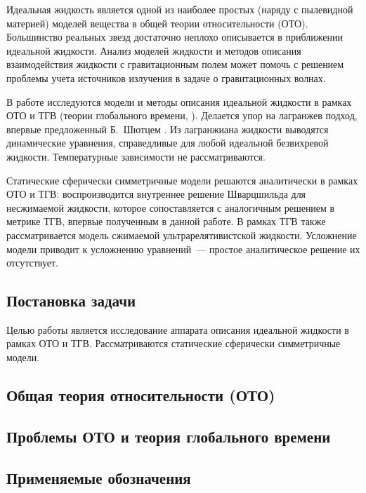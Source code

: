 \documentclass[\docroot/reports/draft/report.tex]{subfiles}
\begin{document}
\onlyinsubfile{\tableofcontents}

Идеальная жидкость является одной из наиболее простых (наряду с пылевидной материей) моделей вещества в общей теории относительности (ОТО). Большинство реальных звезд достаточно неплохо описывается в приближении идеальной жидкости. Анализ моделей жидкости и методов описания взаимодействия жидкости с гравитационным полем может помочь с решением проблемы учета источников излучения в задаче о гравитационных волнах.

В работе исследуются модели и методы описания идеальной жидкости в рамках ОТО и ТГВ (теории глобального времени, \cite{burlankov_space_dynamics,burlankov_grav_waves,burlankov_new_phys}). Делается упор на лагранжев подход, впервые предложенный Б.~Шютцем \cite{schutz_vel_pot}. Из лагранжиана жидкости выводятся динамические уравнения, справедливые для любой идеальной безвихревой жидкости. Температурные зависимости не рассматриваются.

Статические сферически симметричные модели решаются аналитически в рамках ОТО и ТГВ: воспроизводится внутреннее решение Шварцшильда для несжимаемой жидкости, которое сопоставляется с аналогичным решением в метрике ТГВ, впервые полученным в данной работе. В рамках ТГВ также рассматривается модель сжимаемой ультрарелятивистской жидкости. Усложнение модели приводит к усложнению уравнений~--- простое аналитическое решение их отсутствует.

\subsection{Постановка задачи}

Целью работы является исследование аппарата описания идеальной жидкости в рамках ОТО и ТГВ. Рассматриваются статические сферически симметричные модели.

\subsection{Общая теория относительности (ОТО)}


\subsection{Проблемы ОТО и теория глобального времени}


\subsection{Применяемые обозначения}


\end{document}
